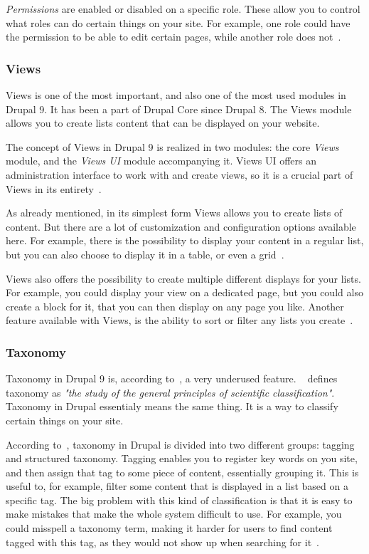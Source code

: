 \emph{Permissions} are enabled or disabled on a specific role. These allow you to control what roles can do certain things on your site. For example, one role could have the permission to be able to edit certain pages, while another role does not~\autocite{Tomlinson2015}.

\subsubsection{Views}

Views is one of the most important, and also one of the most used modules in Drupal 9. It has been a part of Drupal Core since Drupal 8. The Views module allows you to create lists content that can be displayed on your website.

The concept of Views in Drupal 9 is realized in two modules: the core \emph{Views} module, and the \emph{Views UI} module accompanying it. Views UI offers an administration interface to work with and create views, so it is a crucial part of Views in its entirety~\autocite{Tomlinson2015}.

As already mentioned, in its simplest form Views allows you to create lists of content. But there are a lot of customization and configuration options available here. For example, there is the possibility to display your content in a regular list, but you can also choose to display it in a table, or even a grid~\autocite{Tomlinson2015}.

Views also offers the possibility to create multiple different displays for your lists. For example, you could display your view on a dedicated page, but you could also create a block for it, that you can then display on any page you like. Another feature available with Views, is the ability to sort or filter any lists you create~\autocite{Tomlinson2015}.

\subsubsection{Taxonomy}

Taxonomy in Drupal 9 is, according to~\textcite{Tomlinson2015}, a very underused feature. ~\textcite{MerriamWebsterTax} defines taxonomy as \emph{"the study of the general principles of scientific classification"}. Taxonomy in Drupal essentialy means the same thing. It is a way to classify certain things on your site.

According to~\textcite{Tomlinson2015}, taxonomy in Drupal is divided into two different groups: tagging and structured taxonomy. Tagging enables you to register key words on you site, and then assign that tag to some piece of content, essentially grouping it. This is useful to, for example, filter some content that is displayed in a list based on a specific tag. The big problem with this kind of classification is that it is easy to make mistakes that make the whole system difficult to use. For example, you could misspell a taxonomy term, making it harder for users to find content tagged with this tag, as they would not show up when searching for it~\autocite{Tomlinson2015}.

